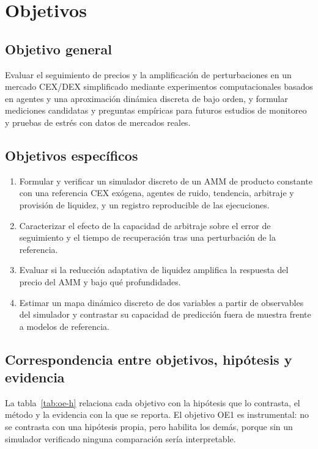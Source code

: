 \chapter{Objetivos}
\label{cap:objetivos}

\section{Objetivo general}

Evaluar el seguimiento de precios y la amplificación de perturbaciones en un mercado CEX/DEX simplificado mediante experimentos computacionales basados en agentes y una aproximación dinámica discreta de bajo orden, y formular mediciones candidatas y preguntas empíricas para futuros estudios de monitoreo y pruebas de estrés con datos de mercados reales.

\section{Objetivos específicos}

\begin{enumerate}[label=\textbf{OE\arabic*.}, leftmargin=3em]
  \item Formular y verificar un simulador discreto de un AMM de producto constante con una referencia CEX exógena, agentes de ruido, tendencia, arbitraje y provisión de liquidez, y un registro reproducible de las ejecuciones.
  \item Caracterizar el efecto de la capacidad de arbitraje sobre el error de seguimiento y el tiempo de recuperación tras una perturbación de la referencia.
  \item Evaluar si la reducción adaptativa de liquidez amplifica la respuesta del precio del AMM y bajo qué profundidades.
  \item Estimar un mapa dinámico discreto de dos variables a partir de observables del simulador y contrastar su capacidad de predicción fuera de muestra frente a modelos de referencia.
\end{enumerate}

\section{Correspondencia entre objetivos, hipótesis y evidencia}

La tabla~\ref{tab:oe-h} relaciona cada objetivo con la hipótesis que lo contrasta, el método y la evidencia con la que se reporta. El objetivo OE1 es instrumental: no se contrasta con una hipótesis propia, pero habilita los demás, porque sin un simulador verificado ninguna comparación sería interpretable.

